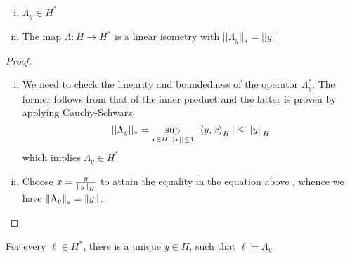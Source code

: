 \documentclass{article}
\begin{document}
\begin{lemma}
    \\
    \begin{enumerate}[i)]
        \item  \(\Lambda_y \in H^*\)
        \item The map  \(\Lambda: H \to H^*\) is a linear isometry with  \(||\Lambda_y||_{*}=||y||\)
    \end{enumerate}
\end{lemma}  

\begin{proof}
    \begin{enumerate}[i)]
        \item We need to check the linearity and boundedness of the operator  \(\Lambda_y^*\). The former follows from that of the inner product and the latter is proven by applying Cauchy-Schwarz  
        \begin{equation*}
            ||\Lambda_y||_* = \sup_{x\in H, ||x|| \leq 1} |\left<{y},{x}\right>_H| \leq \left\|{y}\right\|_H
        \end{equation*}  
        which implies  \(\Lambda_y \in H^*\)
        
        \item Choose  \(x = \frac{y}{\left\|{y}\right\|_H}\) to attain the equality in the equation above , whence we have  \(\left\|{\Lambda_y}\right\|_*=\left\|{y}\right\|\).
    \end{enumerate}
\end{proof}

\begin{theorem}
     \nl
    \label{riesz representation}
    For every  \(\ell \in H^*\), there is a unique  \(y \in H\), such that  \(\ell=\Lambda_y\)
\end{theorem}  
\end{document}
